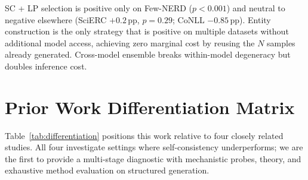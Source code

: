 \begin{table}[h]
\centering
\small
\caption{Cost-benefit summary of aggregation strategies (Qwen3-8B, $N{=}8$, $T{=}1.0$). Inference cost is relative to greedy ($T{=}0$, single forward pass). $\Delta$F1 reports the primary result (dataset in parentheses).}
\label{tab:cost_benefit}
\end{table}

SC + LP selection is positive only on Few-NERD ($p{<}0.001$) and neutral to negative elsewhere (SciERC $+0.2$\,pp, $p{=}0.29$; CoNLL $-0.85$\,pp).
Entity construction is the only strategy that is positive on multiple datasets without additional model access, achieving zero marginal cost by reusing the $N$ samples already generated.
Cross-model ensemble breaks within-model degeneracy but doubles inference cost.

\section{Prior Work Differentiation Matrix}\label{app:differentiation}

Table~\ref{tab:differentiation} positions this work relative to four closely related studies.
All four investigate settings where self-consistency underperforms; we are the first to provide a multi-stage diagnostic with mechanistic probes, theory, and exhaustive method evaluation on structured generation.

